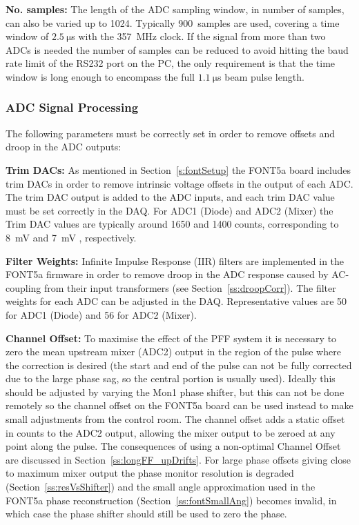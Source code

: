 \textbf{No. samples:} The length of the ADC sampling window, in number of samples, can also be varied up to 1024. Typically 900~samples are used, covering a time window of \(2.5~\mathrm{\mu}\)s with the 357~MHz clock. If the signal from more than two ADCs is needed the number of samples can be reduced to avoid hitting the baud rate limit of the RS232 port on the PC, the only requirement is that the time window is long enough to encompass the full \(1.1~\mathrm{\mu}\)s beam pulse length.

\subsubsection{ADC Signal Processing}

The following parameters must be correctly set in order to remove offsets and droop in the ADC outputs:

\textbf{Trim DACs:} As mentioned in Section~\ref{s:fontSetup} the FONT5a board includes trim DACs in order to remove intrinsic voltage offsets in the output of each ADC. The trim DAC output is added to the ADC inputs, and each trim DAC value must be set correctly in the DAQ. For ADC1 (Diode) and ADC2 (Mixer) the Trim DAC values are typically around 1650 and 1400 counts, corresponding to 8~mV and 7~mV \cite{dougThesis}, respectively.

\textbf{Filter Weights:} Infinite Impulse Response (IIR) filters are implemented in the FONT5a firmware in order to remove droop in the ADC response caused by AC-coupling from their input transformers (see Section~\ref{ss:droopCorr}). The filter weights for each ADC can be adjusted in the DAQ. Representative values are 50 for ADC1 (Diode) and 56 for ADC2 (Mixer).

\textbf{Channel Offset:} 
To maximise the effect of the PFF system it is necessary to zero the mean upstream mixer (ADC2) output in the region of the pulse where the correction is desired (the start and end of the pulse can not be fully corrected due to the large phase sag, so the central portion is usually used). 
Ideally this should be adjusted by varying the Mon1 phase shifter, but this can not be done remotely so the channel offset on the FONT5a board can be used instead to make small adjustments from the control room.
The channel offset adds a static offset in counts to the ADC2 output, allowing the mixer output to be zeroed at any point along the pulse. The consequences of using a non-optimal Channel Offset are discussed in Section~\ref{ss:longFF_upDrifts}. 
For large phase offsets giving close to maximum mixer output the phase monitor resolution is degraded (Section~\ref{ss:resVsShifter}) and the small angle approximation used in the FONT5a phase reconstruction (Section~\ref{ss:fontSmallAng}) becomes invalid, in which case the phase shifter should still be used to zero the phase. 

